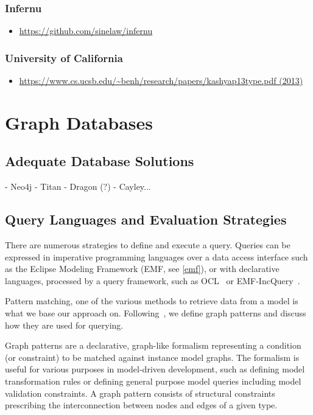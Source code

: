 \subsubsection{Infernu}
\begin{itemize}
 \item \url{https://github.com/sinelaw/infernu}
\end{itemize}

\subsubsection{University of California}
\begin{itemize}
 \item \url{https://www.cs.ucsb.edu/~benh/research/papers/kashyap13type.pdf (2013)}
\end{itemize}


\section{Graph Databases}
\subsection{Adequate Database Solutions}
- Neo4j
- Titan
- Dragon (?)
- Cayley...

\subsection{Query Languages and Evaluation Strategies}
There are numerous strategies to define and execute a query. Queries can be expressed in imperative programming languages over a data access interface such as the Eclipse Modeling Framework (EMF, see \ref{emf}), or with declarative languages, processed by a query framework, such as OCL~\cite{OCL} or EMF-IncQuery~\cite{IncQuery}.

Pattern matching, one of the various methods to retrieve data from a model is what we base our approach on. Following~\cite{csmr}, we define graph patterns and discuss how they are used for querying.

Graph patterns are a declarative, graph-like formalism representing a
condition (or constraint) to be matched against instance model graphs. The
formalism is useful for various purposes in model-driven development, such as
defining model transformation rules or defining general purpose model queries
including model validation constraints. A graph pattern consists of structural
constraints prescribing the interconnection between nodes and edges of a given
type.

